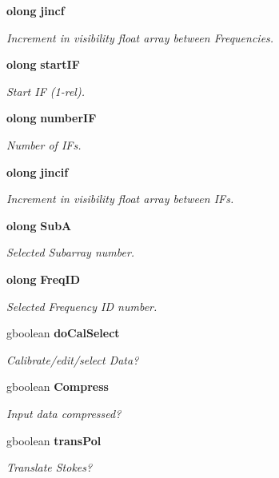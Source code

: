 \begin{CompactItemize}
{\bf olong} {\bf jincf}
\begin{CompactList}\small\item\em Increment in visibility float array between Frequencies. \item\end{CompactList}\item 
{\bf olong} {\bf start\-IF}
\begin{CompactList}\small\item\em Start IF (1-rel). \item\end{CompactList}\item 
{\bf olong} {\bf number\-IF}
\begin{CompactList}\small\item\em Number of IFs. \item\end{CompactList}\item 
{\bf olong} {\bf jincif}
\begin{CompactList}\small\item\em Increment in visibility float array between IFs. \item\end{CompactList}\item 
{\bf olong} {\bf Sub\-A}
\begin{CompactList}\small\item\em Selected Subarray number. \item\end{CompactList}\item 
{\bf olong} {\bf Freq\-ID}
\begin{CompactList}\small\item\em Selected Frequency ID number. \item\end{CompactList}\item 
gboolean {\bf do\-Cal\-Select}
\begin{CompactList}\small\item\em Calibrate/edit/select Data? \item\end{CompactList}\item 
gboolean {\bf Compress}
\begin{CompactList}\small\item\em Input data compressed? \item\end{CompactList}\item 
gboolean {\bf trans\-Pol}
\begin{CompactList}\small\item\em Translate Stokes? \item\end{CompactList}\item 

\end{CompactItemize}
